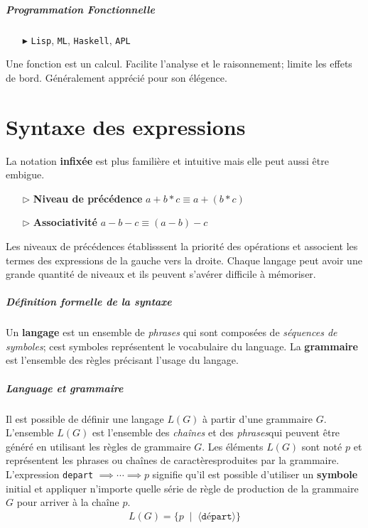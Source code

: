 \documentclass{report}
\begin{document}
\begin{multicols*}{3}
    \paragraph{Programmation Fonctionnelle}
    \begin{itemize}
        \item [$\blacktriangleright$ ] \texttt{Lisp}, \texttt{ML}, \texttt{Haskell}, \texttt{APL}
    \end{itemize}
    Une fonction est un calcul. Facilite l'analyse et le raisonnement; limite les effets de bord. 
    Généralement apprécié pour son élégence. 


    \chapter{Syntaxe des expressions}
    La notation \textbf{infixée} est plus familière et intuitive mais elle peut aussi être embigue.   
    \begin{itemize}
        \item [$\rhd$ ] \textbf{Niveau de précédence} $a + b * c \equiv a + (b * c)$  
        \item [$\rhd$ ] \textbf{Associativité} $a - b - c \equiv (a - b) - c$
    \end{itemize}
    Les niveaux de précédences établisssent la priorité des opérations et associent les termes 
    des expressions de la gauche vers la droite. Chaque langage peut avoir une grande quantité 
    de niveaux et ils peuvent s'avérer difficile à mémoriser. 

    \paragraph{Définition formelle de la syntaxe}
    Un \textbf{langage} est un ensemble de \textit{phrases} qui sont composées de 
    \textit{séquences de symboles}; cest symboles représentent le vocabulaire du language. 
    La \textbf{grammaire} est l'ensemble des règles précisant l'usage du langage.  

    \paragraph{Language et grammaire}
    Il est possible de définir une langage $L(G)$ à partir d'une grammaire $G$. L'ensemble $L(G)$ est 
    l'ensemble des \textit{chaînes} et des \textit{phrases}qui peuvent être généré en utilisant les 
    règles de grammaire $G$. Les éléments $L(G)$ sont noté $p$ et représentent les 
    phrases ou chaînes de caractèresproduites par la grammaire. L'expression 
    \texttt{depart} $\implies \cdots \implies p$ signifie qu'il est possible d'utiliser un \textbf{symbole} initial 
    et appliquer n'importe quelle série de règle de production de la grammaire $G$ pour arriver à la 
    chaîne $p$. 
    \begin{align*}
    L(G) = \bigl\{ p \;\; | \;\; \langle \texttt{départ}  \rangle \bigr\}
    \end{align*}


\end{multicols*}
\end{document}
